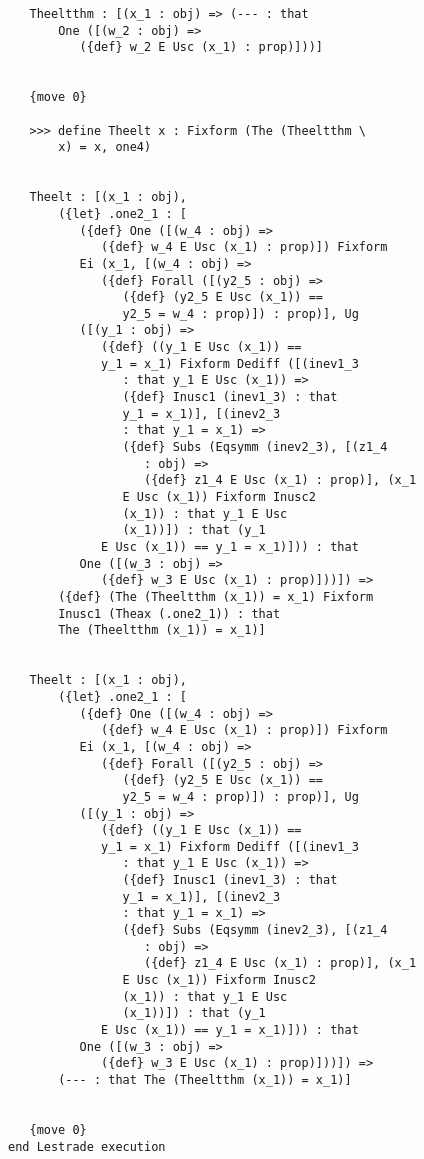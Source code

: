 \documentclass[12pt]{article}
\begin{document}
\begin{verbatim}
   Theeltthm : [(x_1 : obj) => (--- : that 
       One ([(w_2 : obj) => 
          ({def} w_2 E Usc (x_1) : prop)]))]


   {move 0}

   >>> define Theelt x : Fixform (The (Theeltthm \
       x) = x, one4)


   Theelt : [(x_1 : obj), 
       ({let} .one2_1 : [
          ({def} One ([(w_4 : obj) => 
             ({def} w_4 E Usc (x_1) : prop)]) Fixform 
          Ei (x_1, [(w_4 : obj) => 
             ({def} Forall ([(y2_5 : obj) => 
                ({def} (y2_5 E Usc (x_1)) == 
                y2_5 = w_4 : prop)]) : prop)], Ug 
          ([(y_1 : obj) => 
             ({def} ((y_1 E Usc (x_1)) == 
             y_1 = x_1) Fixform Dediff ([(inev1_3 
                : that y_1 E Usc (x_1)) => 
                ({def} Inusc1 (inev1_3) : that 
                y_1 = x_1)], [(inev2_3 
                : that y_1 = x_1) => 
                ({def} Subs (Eqsymm (inev2_3), [(z1_4 
                   : obj) => 
                   ({def} z1_4 E Usc (x_1) : prop)], (x_1 
                E Usc (x_1)) Fixform Inusc2 
                (x_1)) : that y_1 E Usc 
                (x_1))]) : that (y_1 
             E Usc (x_1)) == y_1 = x_1)])) : that 
          One ([(w_3 : obj) => 
             ({def} w_3 E Usc (x_1) : prop)]))]) => 
       ({def} (The (Theeltthm (x_1)) = x_1) Fixform 
       Inusc1 (Theax (.one2_1)) : that 
       The (Theeltthm (x_1)) = x_1)]


   Theelt : [(x_1 : obj), 
       ({let} .one2_1 : [
          ({def} One ([(w_4 : obj) => 
             ({def} w_4 E Usc (x_1) : prop)]) Fixform 
          Ei (x_1, [(w_4 : obj) => 
             ({def} Forall ([(y2_5 : obj) => 
                ({def} (y2_5 E Usc (x_1)) == 
                y2_5 = w_4 : prop)]) : prop)], Ug 
          ([(y_1 : obj) => 
             ({def} ((y_1 E Usc (x_1)) == 
             y_1 = x_1) Fixform Dediff ([(inev1_3 
                : that y_1 E Usc (x_1)) => 
                ({def} Inusc1 (inev1_3) : that 
                y_1 = x_1)], [(inev2_3 
                : that y_1 = x_1) => 
                ({def} Subs (Eqsymm (inev2_3), [(z1_4 
                   : obj) => 
                   ({def} z1_4 E Usc (x_1) : prop)], (x_1 
                E Usc (x_1)) Fixform Inusc2 
                (x_1)) : that y_1 E Usc 
                (x_1))]) : that (y_1 
             E Usc (x_1)) == y_1 = x_1)])) : that 
          One ([(w_3 : obj) => 
             ({def} w_3 E Usc (x_1) : prop)]))]) => 
       (--- : that The (Theeltthm (x_1)) = x_1)]


   {move 0}
end Lestrade execution
\end{verbatim}
\end{document}
